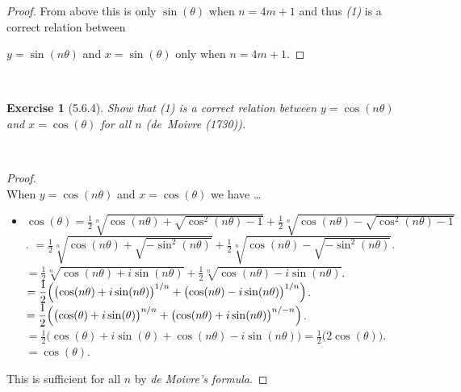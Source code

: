 \documentclass[12pt]{article}
\newcommand{\XB}{\color{black}}
\newcommand{\XBB}{\color{blue}}
\newcommand{\ds}{\displaystyle}
\theoremstyle{plain}
\newtheorem{ex}{Exercise}
\begin{document}
\begin{proof}
  From above this is only $ \sin(\theta) $ when  $ n = 4m + 1 $ and thus \textit{(1)} is a correct relation between 

  $ y = \sin(n\theta) $ and $ x = \sin(\theta) $ only when $ n = 4m + 1 $.

\end{proof}

\newpage


\XBB\hrulefill\XB \\
\begin{ex} [5.6.4]
  Show that (1) is a correct relation between $ y = \cos(n\theta) $ and $ x = \cos(\theta) $ for all $ n $ (de~Moivre (1730)).
\end{ex}
\XBB\hrulefill\XB \\

\begin{proof}
  \ \\

  When $ y = \cos(n\theta) $ and $ x = \cos(\theta) $ we have \dots
  \begin{itemize}
    \item $ \ds \cos(\theta) = \frac{1}{2} \sqrt[n]{ \ds \cos(n\theta) + \sqrt{ \cos^{2}(n\theta) - 1 } } + \frac{1}{2} \sqrt[n]{ \ds \cos(n\theta) - \sqrt{ \cos^{2}(n\theta) - 1 } } $.
    \subitem $ \ds = \frac{1}{2} \sqrt[n]{ \ds \cos(n\theta) + \sqrt{ - \sin^{2}(n\theta) } } + \frac{1}{2} \sqrt[n]{ \ds \cos(n\theta) - \sqrt{ - \sin^{2}(n\theta) } } $.
    \subitem $ \ds = \frac{1}{2} \sqrt[n]{ \ds \cos(n\theta) + i\sin(n\theta) } + \frac{1}{2} \sqrt[n]{ \ds \cos(n\theta) - i\sin(n\theta) } $.
    \subitem $ \ds = \frac{1}{2} \Bigl( \bigl( \cos(n\theta) + i\sin(n\theta) \bigr)^{1/n} + \bigl( \cos(n\theta) - i\sin(n\theta) \bigr)^{1/n} \Bigr) $.
    \subitem $ \ds = \frac{1}{2} \Bigl( \bigl( \cos(\theta) + i\sin(\theta) \bigr)^{n/n} + \bigl( \cos(n\theta) + i\sin(n\theta) \bigr)^{n/-n} \Bigr) $.
    \subitem $ \ds = \frac{1}{2} \bigl( \cos(\theta) + i\sin(\theta) + \cos(n\theta) - i\sin(n\theta) \bigr) = \frac{1}{2} \bigl( 2\cos(\theta) \bigr) $.
    \subitem $ \ds = \cos(\theta) $.
  \end{itemize}

  This is sufficient for all $ n $ by \textit{de Moivre's formula}.
  
\end{proof}

\newpage
\end{document}
